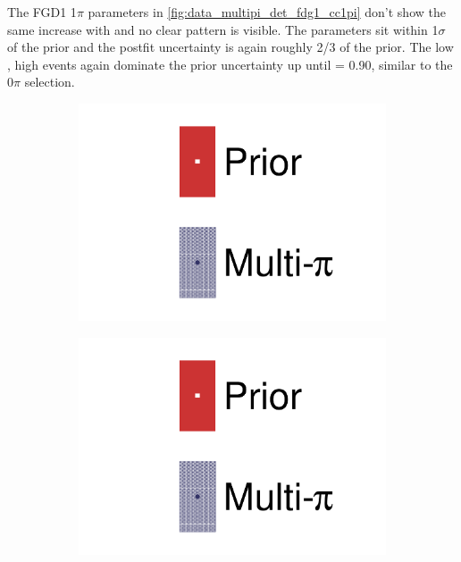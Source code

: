 The FGD1 1$\pi$ parameters in \autoref{fig:data_multipi_det_fdg1_cc1pi} don't show the same increase with \pmu and no clear pattern is visible. The parameters sit within 1$\sigma$ of the prior and the postfit uncertainty is again roughly 2/3 of the prior. The low \cosmu, high \pmu events again dominate the prior uncertainty up until \cosmu= 0.90, similar to the 0$\pi$ selection.
\begin{figure}[h]
	\centering
	\begin{subfigure}[t]{0.32\textwidth}
		\includegraphics[width=\textwidth,page=28, trim={0mm 0mm 0mm 0mm}, clip]{figures/mach3/2018/data/2018a_FixedCov_RedCov_Mpi_Data_merge_drawPar_withDet}
	\end{subfigure}
	\begin{subfigure}[t]{0.32\textwidth}
		\includegraphics[width=\textwidth,page=29, trim={0mm 0mm 0mm 0mm}, clip]{figures/mach3/2018/data/2018a_FixedCov_RedCov_Mpi_Data_merge_drawPar_withDet}

\end{subfigure}
\end{figure}
